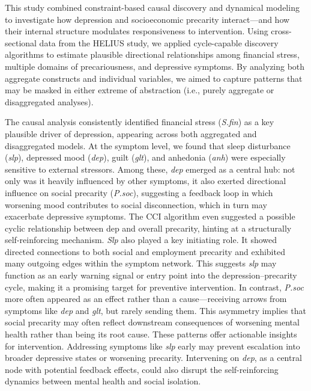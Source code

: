 \documentclass[
]{article}
\begin{document}
This study combined constraint-based causal discovery and dynamical
modeling to investigate how depression and socioeconomic precarity
interact---and how their internal structure modulates responsiveness to
intervention. Using cross-sectional data from the HELIUS study, we
applied cycle-capable discovery algorithms to estimate plausible
directional relationships among financial stress, multiple domains of
precariousness, and depressive symptoms. By analyzing both aggregate
constructs and individual variables, we aimed to capture patterns that
may be masked in either extreme of abstraction (i.e., purely aggregate
or disaggregated analyses).

The causal analysis consistently identified financial stress
(\emph{S.fin}) as a key plausible driver of depression, appearing across
both aggregated and disaggregated models. At the symptom level, we found
that sleep disturbance (\emph{slp}), depressed mood (\emph{dep}), guilt
(\emph{glt}), and anhedonia (\emph{anh}) were especially sensitive to
external stressors. Among these, \emph{dep} emerged as a central hub:
not only was it heavily influenced by other symptoms, it also exerted
directional influence on social precarity (\emph{P.soc}), suggesting a
feedback loop in which worsening mood contributes to social
disconnection, which in turn may exacerbate depressive symptoms. The CCI
algorithm even suggested a possible cyclic relationship between dep and
overall precarity, hinting at a structurally self-reinforcing mechanism.
\emph{Slp} also played a key initiating role. It showed directed
connections to both social and employment precarity and exhibited many
outgoing edges within the symptom network. This suggests \emph{slp} may
function as an early warning signal or entry point into the
depression--precarity cycle, making it a promising target for preventive
intervention. In contrast, \emph{P.soc} more often appeared as an effect
rather than a cause---receiving arrows from symptoms like \emph{dep} and
\emph{glt}, but rarely sending them. This asymmetry implies that social
precarity may often reflect downstream consequences of worsening mental
health rather than being its root cause. These patterns offer actionable
insights for intervention. Addressing symptoms like \emph{slp} early may
prevent escalation into broader depressive states or worsening
precarity. Intervening on \emph{dep}, as a central node with potential
feedback effects, could also disrupt the self-reinforcing dynamics
between mental health and social isolation.
\end{document}
